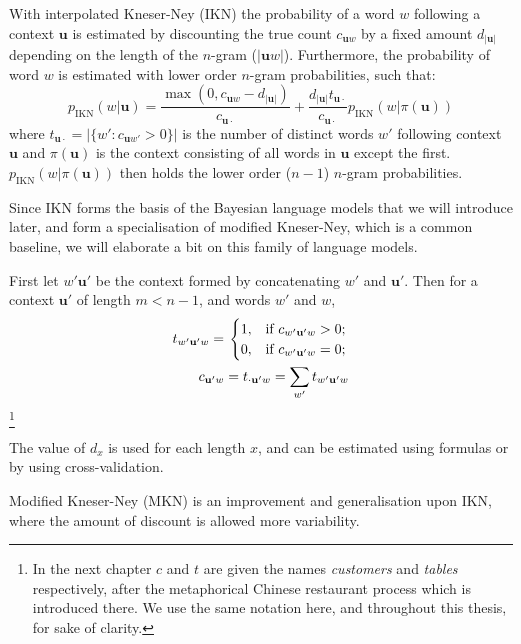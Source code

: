With interpolated Kneser-Ney (IKN) the probability of a word $w$ following a context $\mathbf{u}$ is estimated by discounting the true count $c_{\mathbf{u}w}$ by a fixed amount $d_{|\mathbf{u}|}$ depending on the length of the $n$-gram ($|\mathbf{u}w|$). Furthermore, the probability of word $w$ is estimated with lower order $n$-gram probabilities, such that:
\begin{equation}
p_{\operatorname{IKN}}(w|\mathbf{u}) = \frac{\max(0, c_{\mathbf{u}w} - d_{|\mathbf{u}|})}{c_{\mathbf{u}\cdot}} + \frac{d_{|\mathbf{u}|}t_{\mathbf{u}\cdot}}{c_{\mathbf{u}\cdot}}p_{\operatorname{IKN}}(w|\pi(\mathbf{u}))
\end{equation}
where $t_{\mathbf{u}\cdot} = |\{ w' : c_{\mathbf{u}w'} > 0 \}|$ is the number of distinct words $w'$ following context $\mathbf{u}$ and $\pi(\mathbf{u})$ is the context consisting of all words in $\mathbf{u}$ except the first. $p_{\operatorname{IKN}}(w|\pi(\mathbf{u}))$ then holds the lower order ($n-1$) $n$-gram probabilities. 

Since IKN forms the basis of the Bayesian language models that we will introduce later, and form a specialisation of modified Kneser-Ney, which is a common baseline, we will elaborate a bit on this family of language models.

First let $w'\mathbf{u'}$ be the context formed by concatenating $w'$ and $\mathbf{u'}$. Then for a context $\mathbf{u'}$ of length $m<n-1$, and words $w'$ and $w$,
\begin{equation}
\begin{split}
t_{w'\mathbf{u'}w} = \left.
\begin{cases}
1, & \textnormal{if } c_{w'\mathbf{u'}w} > 0; \\
0, & \textnormal{if } c_{w'\mathbf{u'}w} = 0;
\end{cases}
\right. \\
c_{\mathbf{u'}w} = t_{\cdot\mathbf{u'}w} = \sum_{w'}t_{w'\mathbf{u'}w}
\end{split}
\end{equation}\footnote{In the next chapter $c$ and $t$ are given the names \emph{customers} and \emph{tables} respectively, after the metaphorical Chinese restaurant process which is introduced there. We use the same notation here, and throughout this thesis, for sake of clarity.}

The value of $d_x$ is used for each length $x$, and can be estimated using formulas or by using cross-validation.

Modified Kneser-Ney (MKN) is an improvement and generalisation upon IKN, where the amount of discount is allowed more variability. 